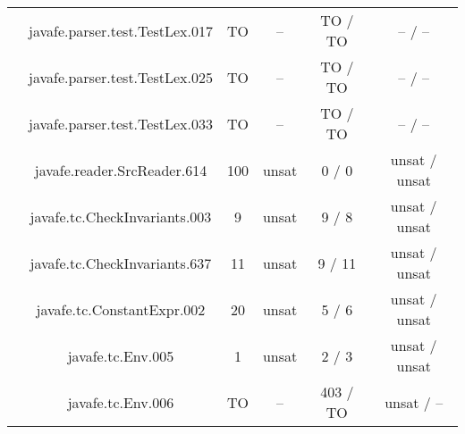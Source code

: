 \begin{table}[htbp]
\begin{minipage}{0.60\textwidth}
{\begin{tabular}[c]{c c!{\vrule width 1.5pt}c|c!{\vrule width 1.5pt}c|c|}
 			& javafe.parser.test.TestLex.017	   		     & TO   & --      & TO  / TO       & --    / --        \\
 			& javafe.parser.test.TestLex.025	   		     & TO   & --      & TO  / TO       & --    / --        \\
 			& javafe.parser.test.TestLex.033	   		     & TO   & --      & TO  / TO       & --    / --        \\
 			& javafe.reader.SrcReader.614		   		     & 100  & unsat   & 0   / 0        & unsat / unsat     \\
 			& javafe.tc.CheckInvariants.003		   		     & 9    & unsat   & 9   / 8        & unsat / unsat     \\
 			& javafe.tc.CheckInvariants.637		   		     & 11   & unsat   & 9   / 11       & unsat / unsat     \\
 			& javafe.tc.ConstantExpr.002		   		     & 20   & unsat   & 5   / 6        & unsat / unsat     \\
 			& javafe.tc.Env.005			   		     & 1    & unsat   & 2   / 3        & unsat / unsat     \\
 			& javafe.tc.Env.006			   		     & TO   & --      & 403 / TO       & unsat / --        \\

\end{tabular}}
\end{minipage}
\end{table}
